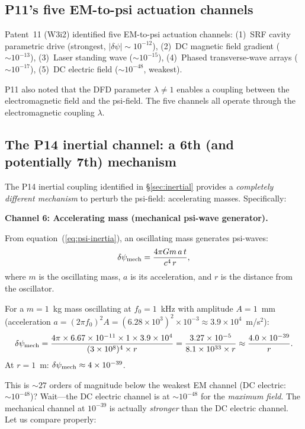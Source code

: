 \documentclass[11pt]{article}
\newcommand{\ee}[1]{\times 10^{#1}}
\begin{document}
\subsection{P11's five EM-to-psi actuation channels}

Patent~11 (W3i2) identified five EM-to-psi actuation channels:
(1)~SRF cavity parametric drive (strongest, $|\delta\psi| \sim 10^{-12}$),
(2)~DC magnetic field gradient ($\sim 10^{-13}$),
(3)~Laser standing wave ($\sim 10^{-15}$),
(4)~Phased transverse-wave arrays ($\sim 10^{-17}$),
(5)~DC electric field ($\sim 10^{-48}$, weakest).

P11 also noted that the DFD parameter $\lambda \neq 1$ enables a coupling
between the electromagnetic field and the psi-field. The five channels all
operate through the electromagnetic coupling $\lambda$.

\subsection{The P14 inertial channel: a 6th (and potentially 7th) mechanism}

The P14 inertial coupling identified in \S\ref{sec:inertial} provides a
\emph{completely different mechanism} to perturb the psi-field:
accelerating masses. Specifically:

\textbf{Channel 6: Accelerating mass (mechanical psi-wave generator).}

From equation~(\ref{eq:psi-inertia}), an oscillating mass generates psi-waves:
\begin{equation}
\delta\psi_{\rm mech} = \frac{4\pi G m\,a\,t}{c^4\,r},
\label{eq:psi-mech}
\end{equation}
where $m$ is the oscillating mass, $a$ is its acceleration, and $r$ is the
distance from the oscillator.

For a $m = 1$~kg mass oscillating at $f_0 = 1$~kHz with amplitude $A = 1$~mm
(acceleration $a = (2\pi f_0)^2 A = (6.28\ee{3})^2\times 10^{-3} \approx 3.9\ee{4}$~m/s$^2$):
\begin{equation}
\delta\psi_{\rm mech} = \frac{4\pi\times 6.67\ee{-11}\times 1\times 3.9\ee{4}}{(3\ee{8})^4\times r}
= \frac{3.27\ee{-5}}{8.1\ee{33}\times r} \approx \frac{4.0\ee{-39}}{r}.
\label{eq:psi-mech-num}
\end{equation}
At $r = 1$~m: $\delta\psi_{\rm mech} \approx 4\ee{-39}$.

This is $\sim 27$ orders of magnitude below the weakest EM channel (DC electric:
$\sim 10^{-48}$)? Wait---the DC electric channel is at $\sim 10^{-48}$ for the
\emph{maximum field}. The mechanical channel at $10^{-39}$ is actually
\emph{stronger} than the DC electric channel. Let us compare properly:
\end{document}
